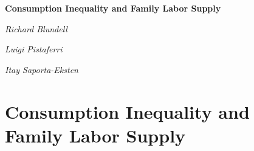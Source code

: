 \documentclass[notes=show]{beamer}
\begin{document}
\begin{frame}%


\bigskip

\begin{center}
\textbf{Consumption Inequality and Family Labor Supply}

\textit{Richard Blundell}

\textit{Luigi Pistaferri}

\textit{Itay Saporta-Eksten}
\end{center}

\bigskip

\transboxout%
\end{frame}%

\section{Consumption Inequality and Family Labor Supply}
\end{document}
